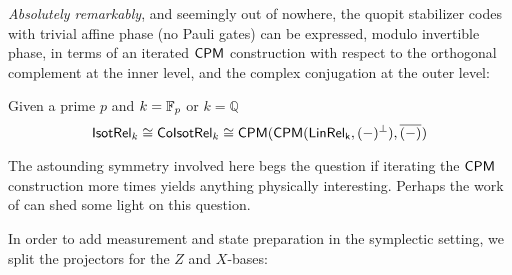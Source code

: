 {\em Absolutely remarkably}, and seemingly out of nowhere, the quopit stabilizer codes with trivial affine phase (no Pauli gates) can be expressed, modulo invertible phase, in terms of an iterated $\mathsf{CPM}$ construction with respect to the orthogonal complement at the inner level, and the complex conjugation at the outer level:
\begin{corollary}
Given a prime $p$ and $k=\mathbb{F}_p$ or $k=\mathbb{Q}$
$${\sf Isot}\mathsf{Rel}_{k}\cong{\sf Co}{\sf Isot}\mathsf{Rel}_{k}\cong \mathsf{CPM}(\mathsf{CPM}(\sf LinRel_{k},(-)^\perp),\overline{(-)}\hspace*{.01cm})$$
\end{corollary}
The astounding symmetry involved here begs the question if iterating the $\mathsf{CPM}$ construction more times yields anything physically interesting. Perhaps the work of \cite{CPMho} can shed some light on this question. 

In order to add measurement and state preparation in the symplectic setting, we split the projectors for the $Z$ and $X$-bases:

